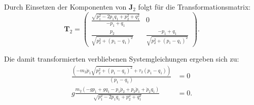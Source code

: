Durch Einsetzen der Komponenten von $\mathbf{J}_2$ folgt für die Transformationsmatrix:
\begin{equation}
	\mathbf{T}_2 =
	\left(\begin{matrix}
	\frac{\sqrt{p_{1}^{2} - 2 p_{1} q_{1} + p_{2}^{2} + q_{1}^{2}}}{- p_{1} + q_{1}} & 0\\
	\frac{p_{2}}{\sqrt{p_{2}^{2} + \left(p_{1} - q_{1}\right)^{2}}} & \frac{- p_{1} + q_{1}}{\sqrt{p_{2}^{2} + \left(p_{1} - q_{1}\right)^{2}}}
	\end{matrix}\right).
\end{equation}

Die damit transformierten verbliebenen Systemgleichungen ergeben sich zu:
\begin{subequations}
	\begin{align}
	\frac{\left(- m_{2} \ddot{p}_{1} \sqrt{p_{2}^{2} + \left(p_{1} - q_{1}\right)^{2}} + \tau_{2} \left(p_{1} - q_{1}\right)\right)}{\left(p_{1} - q_{1}\right)} &= 0 \label{single_flat_transformed_syseq1}\\
	g\frac{m_{2} \left(- g p_{1} + g q_{1} - p_{1} \ddot{p}_{2} + p_{2} \ddot{p}_{1} + \ddot{p}_{2} q_{1}\right)}{\sqrt{p_{1}^{2} - 2 p_{1} q_{1} + p_{2}^{2} + q_{1}^{2}}}
	 &= 0\label{single_flat_transformed_syseq2}.
	\end{align}
\end{subequations}

